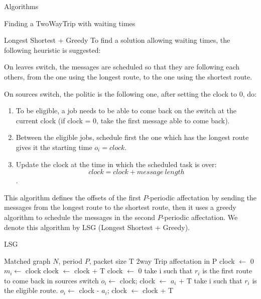 \documentclass[a4paper,10pt]{report}
\begin{document}
\begin{chapter}{Algorithms}
\begin{section}{Finding a TwoWayTrip with waiting times}
\begin{subsection}{Longest Shortest + Greedy}
To find a solution allowing waiting times, the following heuristic is suggested:

On leaves switch, the messages are scheduled so that they are following each others, from the one using the longest route, to the one using the shortest route.

On sources switch, the politic is the following one, after setting the clock to 0, do:
\begin{enumerate}
 \item To be eligible, a job needs to be able to come back on the switch at the current clock (if clock = 0, take the first message able to come back).
 \item Between the eligible jobs, schedule first the one which has the longest route gives it the starting time $o_i = clock$.
 \item Update the clock at the time in which the scheduled task is over: $$clock = clock + message\ length$$.
\end{enumerate}

This algorithm defines the offsets of the first $P$-periodic affectation by sending the messages from the longest route to the shortest route, then it uses a greedy algorithm to schedule the messages in the second $P$-periodic affectation. We denote this algorithm by LSG (Longest Shortest + Greedy).

\begin{algorithm}[H]
\caption{LSG}
\begin{algorithmic}
\REQUIRE Matched graph $N$, period $P$, packet size T
\ENSURE 2way Trip affectation in P
\STATE clock $\leftarrow$ 0
\STATE  $m_i \leftarrow$ clock
\STATE clock $\leftarrow$ clock + T
\ENDFOR
\STATE clock $\leftarrow$ 0
\STATE take i such that $r_i$ is the first route to come back in sources switch
\STATE $o_i \leftarrow $ clock;
\STATE clock $\leftarrow$ $a_i$ + T
\STATE take i such that $r_i$ is the eligible route.
\STATE $o_i \leftarrow $ clock - $a_i$;
\STATE clock $\leftarrow$ clock + T

\ENDWHILE

\end{algorithmic}
\end{algorithm}



\end{subsection}
\end{section}
\end{chapter}
\end{document}
